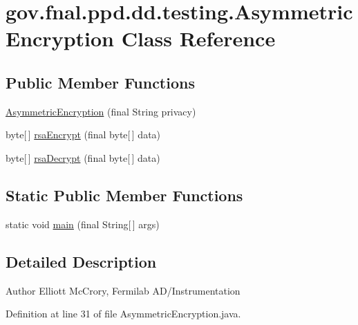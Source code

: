 \hypertarget{classgov_1_1fnal_1_1ppd_1_1dd_1_1testing_1_1AsymmetricEncryption}{\section{gov.\-fnal.\-ppd.\-dd.\-testing.\-Asymmetric\-Encryption Class Reference}
\label{classgov_1_1fnal_1_1ppd_1_1dd_1_1testing_1_1AsymmetricEncryption}
}
\subsection*{Public Member Functions}
\begin{DoxyCompactItemize}
\item 
\hyperlink{classgov_1_1fnal_1_1ppd_1_1dd_1_1testing_1_1AsymmetricEncryption_a5272341af392c74c910ce0874523defe}{Asymmetric\-Encryption} (final String privacy)
\item 
byte\mbox{[}$\,$\mbox{]} \hyperlink{classgov_1_1fnal_1_1ppd_1_1dd_1_1testing_1_1AsymmetricEncryption_a3d19fa6b578aead37afe4328881fe467}{rsa\-Encrypt} (final byte\mbox{[}$\,$\mbox{]} data)
\item 
byte\mbox{[}$\,$\mbox{]} \hyperlink{classgov_1_1fnal_1_1ppd_1_1dd_1_1testing_1_1AsymmetricEncryption_ae076c4919f79815cebae79ca1b62066a}{rsa\-Decrypt} (final byte\mbox{[}$\,$\mbox{]} data)
\end{DoxyCompactItemize}
\subsection*{Static Public Member Functions}
\begin{DoxyCompactItemize}
\item 
static void \hyperlink{classgov_1_1fnal_1_1ppd_1_1dd_1_1testing_1_1AsymmetricEncryption_ae24fff0243749113cb3c1c4c348b8cc3}{main} (final String\mbox{[}$\,$\mbox{]} args)
\end{DoxyCompactItemize}


\subsection{Detailed Description}
\begin{DoxyAuthor}{Author}
Elliott Mc\-Crory, Fermilab A\-D/\-Instrumentation 
\end{DoxyAuthor}


Definition at line 31 of file Asymmetric\-Encryption.\-java.



